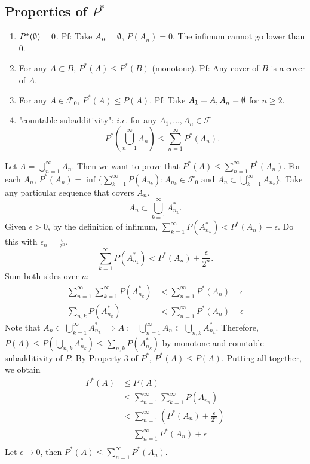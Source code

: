 \documentclass[class=article,crop=false]{standalone}
\begin{document}
\subsection{Properties of $P^* $}
\begin{enumerate}
	\item $P^* (\emptyset)=0$. Pf: Take $A_n=\emptyset$, $P(A_n)=0$. The infimum cannot go lower than 0.
	\item For any $A \subset  B$, $P^*(A) \leq P^* (B)$ (monotone). Pf: Any cover of $B$ is a cover of $A$.
	\item For any  $A \in \mathcal{F}_0$, $P^* (A) \leq P(A)$. Pf: Take $A_1=A, A_n=\emptyset$ for $n\geq 2$. 
	\item "countable subadditivity":  \emph{i.e.} for any $A_1,\ldots,A_n \in \mathcal{F}$ 
		\[
			P^* \left( \bigcup_{n= 1}^{\infty} A_n \right) \leq \sum_{ n=1}^{\infty} P^* (A_n)
		.\]
\end{enumerate}
\begin{prf}
	Let $A=\bigcup_{n= 1}^{\infty} A_n$. Then we want to prove that $P^* (A) \leq \sum_{ n=1}^{\infty} P^* (A_n)$. For each $A_n$, $P^* (A_n) = \inf\{ \sum_{ k=1}^{\infty} P(A_{n_k}): A_{n_k} \in \mathcal{F}_0 \text{ and } A_n \subset \bigcup_{k=1}^{\infty} A_{n_k} \}$. Take any particular sequence that covers $A_n$. 
	\[
		A_n \subset \bigcup_{k= 1}^{\infty} A_{n_k}^*  
	.\] 
	Given $\epsilon>0$, by the definition of infimum, $\sum_{ k=1}^{\infty} P(A_{n_k}^* ) < P^* (A_n)+ \epsilon$.
	Do this with $\epsilon_n=\frac{\epsilon}{2^{n}}$.
	\[
		\sum_{ k=1}^{\infty} P(A_{n_k}^* ) < P^* (A_n) + \frac{\epsilon}{2^{n}}
	.\] 
	Sum both sides over $n$:
	 \begin{align*}
		 \sum_{ n=1}^{\infty} \sum_{ k=1}^{\infty} P(A_{n_k}^*) &< \sum_{ n=1}^{\infty} P^* (A_n) + \epsilon \\
		 \sum_{n,k} P(A_{n_k}^* ) &< \sum_{ n=1}^{\infty} P^*(A_n) +\epsilon
	\end{align*}
	Note that $A_n \subset \bigcup_{k= 1}^{\infty} A_{n_k}^*  \implies A := \bigcup_{n= 1}^{\infty} A_n \subset \bigcup_{n,k} A_{n_k}^*$. Therefore, $ P(A) \leq P\left(\bigcup_{n,k} A_{n_k}^*\right) \leq \sum_{n,k} P(A_{n_k}^* )$ by monotone and countable subadditivity of $P$. 
	By Property 3 of $P^*$, $P^*(A) \leq P(A)$. Putting all together, we obtain
\begin{align*}
	P^*(A) &\leq P(A)  \\
	       &\leq \sum_{ n=1}^{\infty} \sum_{ k=1}^{\infty} P(A_{n_k})  \\
	       &< \sum_{ n=1}^{\infty} \left( P^*(A_n) + \frac{\epsilon}{2^{n}}\right) \\
	       &= \sum_{ n=1}^{\infty} P^*(A_n) + \epsilon\\
\end{align*}
Let $\epsilon \to 0$, then $P^* (A) \leq \sum_{ n=1}^{\infty} P^*(A_n)$.
\end{prf}
\end{document}
